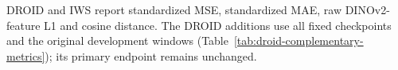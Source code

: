 DROID and IWS report standardized MSE, standardized MAE, raw DINOv2-feature L1 and cosine distance. The DROID additions use all fixed checkpoints and the original development windows (Table~\ref{tab:droid-complementary-metrics}); its primary endpoint remains unchanged.
